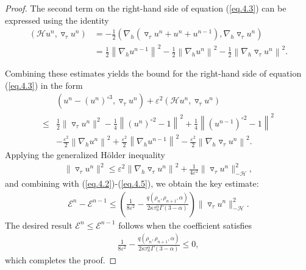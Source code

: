 \documentclass{siamart171218}
\theoremstyle{remark}
\theoremstyle{example}
\numberwithin{equation}{section}
\begin{document}
\begin{proof}
The second term on the right-hand side of equation (\ref{eq.4.3})
can be expressed using the identity
\begin{align*}
	\left(\mathcal{H} u^n, \triangledown_\tau u^n \right) &= -\frac{1}{2}\left( \nabla_h (\triangledown_\tau u^n + u^n + u^{n-1}), \nabla_h \triangledown_\tau u^n \right) \\
	&= \frac{1}{2} \left\| \nabla_h u^{n-1} \right\|^2 - \frac{1}{2} \left\| \nabla_h u^{n} \right\|^2 - \frac{1}{2} \left\| \nabla_h \triangledown_\tau u^n \right\|^2.
\end{align*}





Combining these estimates yields the bound for the right-hand side of equation (\ref{eq.4.3}) in the form
\begin{equation}\label{eq.4.5}
	\begin{aligned}
		&\left(u^{n}- \left(u^{n} \right)^{\circ 3}, \triangledown_\tau u^n \right) + \varepsilon^2 \left(\mathcal{H} u^n, \triangledown_\tau u^n \right) \\
		\leq &\frac{1}{2}\|\triangledown_\tau u^n\|^2 - \frac{1}{4} \left\| \left(u^{n}\right)^{\circ 2}-1 \right\|^2 + \frac{1}{4} \left\| \left(u^{n-1}\right)^{\circ 2}-1 \right\|^2 \\
		&- \frac{\varepsilon^2}{2} \left\| \nabla_h u^{n} \right\|^2 + \frac{\varepsilon^2}{2} \left\| \nabla_h u^{n-1} \right\|^2 - \frac{\varepsilon^2}{2} \left\| \nabla_h \triangledown_\tau u^n \right\|^2.
	\end{aligned}
\end{equation}
Applying the generalized Hölder inequality
\begin{align*}
	\|\triangledown_\tau u^n\|^2 \leq \varepsilon^2 \left\| \nabla_h \triangledown_\tau u^n \right\|^2 + \frac{1}{4\varepsilon^2}\|\triangledown_\tau u^{n} \|_{-\mathcal{H}}^2,
\end{align*}
and combining with (\ref{eq.4.2})-(\ref{eq.4.5}), we obtain the key estimate:
		\begin{align*}
			\mathcal{E}^n- \mathcal{E}^{n-1}
			\leq \left(\frac{1}{8\varepsilon^2}- \frac{q(\rho_n,\rho_{n+1},\alpha) }{2\kappa \tau_{n}^\alpha \Gamma(3-\alpha)}\right) \|\triangledown_\tau u^{n} \|_{-\mathcal{H}}^2 .
		\end{align*}
The desired result $\mathcal{E}^n \leq \mathcal{E}^{n-1}$ follows when the coefficient satisfies
\begin{align*}
	\frac{1}{8\varepsilon^2} - \frac{q(\rho_n,\rho_{n+1},\alpha)}{2\kappa \tau_{n}^\alpha \Gamma(3-\alpha)} \leq 0,
\end{align*}
which completes the proof.
\end{proof}
\end{document}
